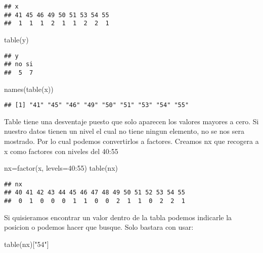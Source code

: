 \documentclass[
]{article}
\newenvironment{Shaded}{\begin{snugshade}}{\end{snugshade}}
\newcommand{\AttributeTok}[1]{\textcolor[rgb]{0.77,0.63,0.00}{#1}}
\newcommand{\DecValTok}[1]{\textcolor[rgb]{0.00,0.00,0.81}{#1}}
\newcommand{\FunctionTok}[1]{\textcolor[rgb]{0.00,0.00,0.00}{#1}}
\newcommand{\NormalTok}[1]{#1}
\newcommand{\OtherTok}[1]{\textcolor[rgb]{0.56,0.35,0.01}{#1}}
\newcommand{\SpecialCharTok}[1]{\textcolor[rgb]{0.00,0.00,0.00}{#1}}
\newcommand{\StringTok}[1]{\textcolor[rgb]{0.31,0.60,0.02}{#1}}
\begin{document}
\begin{verbatim}
## x
## 41 45 46 49 50 51 53 54 55 
##  1  1  1  2  1  1  2  2  1
\end{verbatim}

\begin{Shaded}
\begin{Highlighting}[]
\FunctionTok{table}\NormalTok{(y)}
\end{Highlighting}
\end{Shaded}

\begin{verbatim}
## y
## no si 
##  5  7
\end{verbatim}

\begin{Shaded}
\begin{Highlighting}[]
\FunctionTok{names}\NormalTok{(}\FunctionTok{table}\NormalTok{(x))}
\end{Highlighting}
\end{Shaded}

\begin{verbatim}
## [1] "41" "45" "46" "49" "50" "51" "53" "54" "55"
\end{verbatim}

Table tiene una desventaje puesto que solo aparecen los valores mayores
a cero. Si nuestro datos tienen un nivel el cual no tiene ningun
elemento, no se nos sera mostrado. Por lo cual podemos convertirlos a
factores. Creamos nx que recogera a x como factores con niveles del
40:55

\begin{Shaded}
\begin{Highlighting}[]
\NormalTok{nx}\OtherTok{=}\FunctionTok{factor}\NormalTok{(x, }\AttributeTok{levels=}\DecValTok{40}\SpecialCharTok{:}\DecValTok{55}\NormalTok{)}
\FunctionTok{table}\NormalTok{(nx)}
\end{Highlighting}
\end{Shaded}

\begin{verbatim}
## nx
## 40 41 42 43 44 45 46 47 48 49 50 51 52 53 54 55 
##  0  1  0  0  0  1  1  0  0  2  1  1  0  2  2  1
\end{verbatim}

Si quisieramos encontrar un valor dentro de la tabla podemos indicarle
la posicion o podemos hacer que busque. Solo bastara con usar:

\begin{Shaded}
\begin{Highlighting}[]
 \FunctionTok{table}\NormalTok{(nx)[}\StringTok{"54"}\NormalTok{]}
\end{Highlighting}
\end{Shaded}
\end{document}
